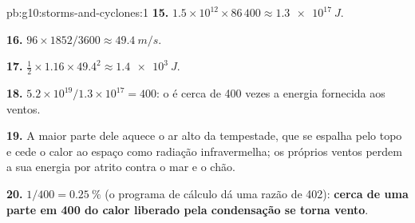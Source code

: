 \begin{solution}{pb:g10:storms-and-cyclones:1}
\textbf{15.} $1.5\times10^{12} \times 86\,400 \approx \qty{1.3e17}{J}$.

\textbf{16.} $96 \times 1852/3600 \approx \qty{49.4}{m/s}$.

\textbf{17.} $\frac12 \times 1.16 \times 49.4^2 \approx \qty{1.4e3}{J}$.

\textbf{18.} $5.2\times10^{19}/1.3\times10^{17} = 400$: o  é
cerca de 400 vezes a energia fornecida aos ventos.

\textbf{19.} A maior parte dele aquece o ar alto da tempestade, que se
espalha pelo topo e cede o calor ao espaço como radiação infravermelha; os
próprios ventos perdem a sua energia por atrito contra o mar e o chão.

\textbf{20.} $1/400 = \qty{0.25}{\percent}$ (o programa de cálculo dá uma
razão de 402): \textbf{cerca de uma parte em 400 do calor liberado pela
condensação se torna vento}.
\end{solution}
